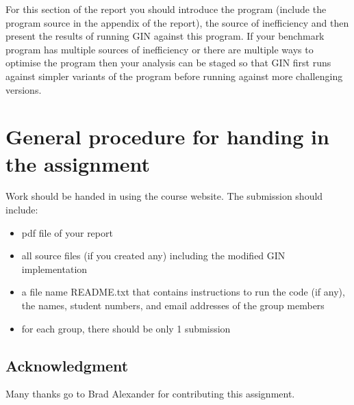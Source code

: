 \documentclass{pracs}
\begin{document}
For this section of the report you should introduce the program (include the program source in the appendix of the report), the source of inefficiency and then present the results of running GIN against this program. If your benchmark program has multiple sources of inefficiency or there are multiple ways to optimise the program then your analysis can be staged so that GIN first runs against simpler variants of the program before running against more challenging versions. 





\section{General procedure for handing in the assignment}
Work should be handed in using the course website. The submission should include:
\begin{itemize}
\item pdf file of your report
\item all source files (if you created any) including the modified GIN implementation
\item a file name README.txt that contains instructions to run the code (if any), the names, student numbers, and email addresses of the group members
\item for each group, there should be only 1 submission
\end{itemize}

\subsection*{Acknowledgment}

Many thanks go to Brad Alexander for contributing this assignment.
\end{document}
